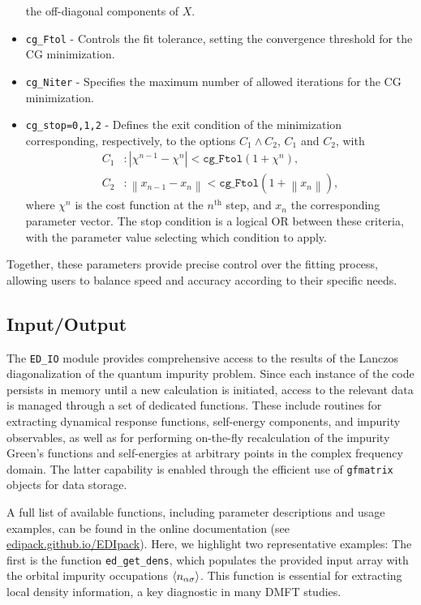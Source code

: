 \documentclass[edipack_sp.tex]{subfiles}
\begin{document}
\begin{itemize}
the off-diagonal components of $X$.
\item \texttt{cg\_Ftol} - Controls the fit tolerance, setting the 
convergence threshold for the CG minimization.
\item \texttt{cg\_Niter} - Specifies the maximum number of allowed 
iterations for the CG minimization.
\item \texttt{cg\_stop=0,1,2} - Defines the exit condition of the 
minimization corresponding, respectively, to the options  $C_1\land C_2$, $C_1$ and $C_2$, with
\begin{align*}
C_1 & : |\chi^{n-1} - \chi^n| < \mathtt{cg\_Ftol} (1+\chi^n), \\
C_2 & : \left\|x_{n-1} - x_n\right\| < 
\mathtt{cg\_Ftol} (1+\left\|x_n\right\|),
\end{align*}
where $\chi^n$ is the cost function at the $n^\mathrm{th}$ step, and 
$x_n$ the corresponding parameter vector. The stop condition is a 
logical OR between these criteria, with the parameter value selecting 
which condition to apply.
\end{itemize}

Together, these parameters provide precise control over the fitting 
process, allowing users to balance speed and accuracy according to 
their specific needs.



\subsection{Input/Output}\label{sSecIO}
The \texttt{ED\_IO} module provides comprehensive access to the 
results of the Lanczos diagonalization of the quantum impurity 
problem. Since each instance of the code persists in memory until a 
new calculation is initiated, access to the relevant data is managed 
through a set of dedicated functions. These include routines for 
extracting dynamical response functions, self-energy components, and 
impurity observables, as well as for performing on-the-fly 
recalculation of the impurity Green's functions and self-energies at 
arbitrary points in the complex frequency domain. The latter 
capability is enabled through the efficient use of \texttt{gfmatrix} 
objects for data storage.

A full list of available functions, including parameter descriptions 
and usage examples, can be found in the online documentation (see \href{https://edipack.github.io/EDIpack/}{edipack.github.io/EDIpack}).  
Here, we highlight two representative examples:
The first is the function \texttt{ed\_get\_dens}, which populates the 
provided input array with the orbital impurity occupations 
$\langle n_{\alpha\sigma}\rangle$. This function is essential for extracting 
local density information, a key diagnostic in many DMFT studies.
\end{document}
